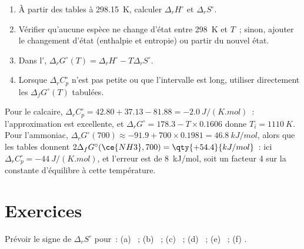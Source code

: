 \begin{method}\label{met:b2:reaction-free-energy:delta-g-standard}
\begin{enumerate}
  \item À partir des tables à \qty{298.15}{K}, calculer $\Delta_r H^\circ$ et
        $\Delta_r S^\circ$.
  \item Vérifier qu'aucune espèce ne change d'état entre \qty{298}{K} et $T$~;
        sinon, ajouter le changement d'état (enthalpie et entropie) ou partir
        du nouvel état.
  \item Dans l', $\Delta_r G^\circ(T) = \Delta_r H^\circ
        - T\Delta_r S^\circ$.
  \item Lorsque $\Delta_r C^\circ_p$ n'est pas petite ou que l'intervalle est long,
        utiliser directement les $\Delta_f G^\circ(T)$ tabulées.
\end{enumerate}
\end{method}

\begin{example}\label{ex:b2:reaction-free-energy:tests}
Pour le calcaire, $\Delta_r C^\circ_p = 42.80 + 37.13 - 81.88 =
\qty{-2.0}{J/(K.mol)}$~: l'approximation est excellente, et $\Delta_r
G^\circ = 178.3 - T \times 0.1606$ donne $T_i = \qty{1110}{K}$. Pour l'ammoniac,
$\Delta_r G^\circ(700) \approx -91.9 + 700 \times 0.1981 =
\qty{+46.8}{kJ/mol}$, alors que les tables donnent $2\Delta_f G^\circ(\ce{NH3}, 700) =
\qty{+54.4}{kJ/mol}$~: ici $\Delta_r C^\circ_p = \qty{-44}{J/(K.mol)}$, et
l'erreur est de \qty{8}{kJ/mol}, soit un facteur 4 sur la constante d'équilibre à
cette température.
\end{example}

\section{Exercices}

\begin{exercise}[$\star$]\label{exo:b2:reaction-free-energy:1}
Prévoir le signe de $\Delta_r S^\circ$ pour~: (a) ~;
(b) ~; (c) ~;
(d) ~; (e) ~;
(f) .
\end{exercise}

